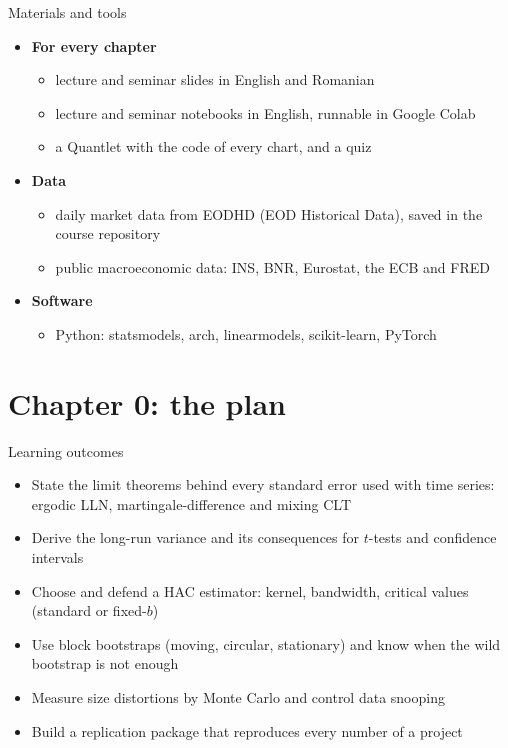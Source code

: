 \begin{frame}{Materials and tools}
\itemsize{\small}
\begin{itemize}
    \item \textbf{For every chapter}
    \begin{itemize}
        \item lecture and seminar slides in English and Romanian
        \item lecture and seminar notebooks in English, runnable in Google Colab
        \item a Quantlet with the code of every chart, and a quiz
    \end{itemize}
    \item \textbf{Data}
    \begin{itemize}
        \item daily market data from EODHD (EOD Historical Data), saved in the course repository
        \item public macroeconomic data: INS, BNR, Eurostat, the ECB and FRED
    \end{itemize}
    \item \textbf{Software}
    \begin{itemize}
        \item Python: statsmodels, arch, linearmodels, scikit-learn, PyTorch
    \end{itemize}
\end{itemize}
\end{frame}


\section{Chapter 0: the plan}

\begin{frame}{Learning outcomes}
\itemsize{\small}
\begin{itemize}
    \item State the limit theorems behind every standard error used with time series: ergodic LLN, martingale-difference and mixing CLT
    \item Derive the long-run variance and its consequences for $t$-tests and confidence intervals
    \item Choose and defend a HAC estimator: kernel, bandwidth, critical values (standard or fixed-$b$)
    \item Use block bootstraps (moving, circular, stationary) and know when the wild bootstrap is not enough
    \item Measure size distortions by Monte Carlo and control data snooping
    \item Build a replication package that reproduces every number of a project
\end{itemize}
\end{frame}

